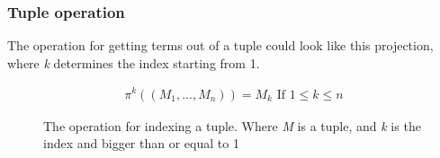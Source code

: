 \subsubsection{Tuple operation}
The operation for getting terms out of a tuple could look like this projection, where \textit{k} determines the index starting from 1.
\begin{figure}[h]
    \begin{align*}
        \pi^k((M_1,..., M_n))=M_k \text{ If } 1\leq k \leq n
    \end{align*}
    \caption{The operation for indexing a tuple. Where \textit{M} is a tuple, and \textit{k} is the index and bigger than  or equal to 1}
\end{figure}
\FloatBarrier
